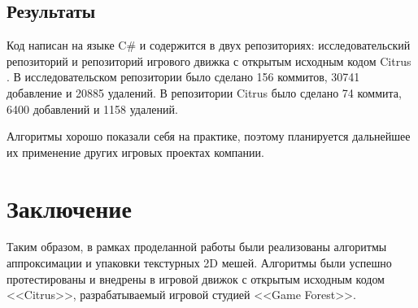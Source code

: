 \documentclass{fefu_thesis/cls/fefu}
\begin{document}
    \subsection{Результаты}

    Код написан на языке C\# и содержится в двух репозиториях: исследовательский репозиторий \cite{PolypackGithub} и репозиторий игрового движка с открытым исходным кодом Citrus \cite{CitrusGithub}. В исследовательском репозитории было сделано 156 коммитов, 30741 добавление и 20885 удалений. В репозитории Citrus было сделано 74 коммита, 6400 добавлений и 1158 удалений.

    Алгоритмы хорошо показали себя на практике, поэтому планируется дальнейшее их применение других игровых проектах компании.

    \pagebreak
    \section*{Заключение}

    Таким образом, в рамках проделанной работы были реализованы алгоритмы аппроксимации и упаковки текстурных 2D мешей. Алгоритмы были успешно протестированы и внедрены в игровой движок с открытым исходным кодом <<Citrus>>, разрабатываемый игровой студией <<Game Forest>>.

    \newpage
    \printbibliography
\end{document}
